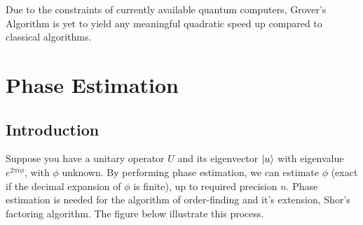 \documentclass{article}
\begin{document}
\noindent
Due to the constraints of currently available quantum computers, Grover's Algorithm is yet to yield any  meaningful quadratic speed up compared to classical algorithms\cite{noauthor_grovers_2022}.

\pagebreak

\section{Phase Estimation}
\vspace{5mm}

\subsection{Introduction}
Suppose you have a unitary operator $U$ and its eigenvector $\ket{u}$ with eigenvalue $e^{2\pi i \phi}$, with $\phi$ unknown. By performing phase estimation, we can estimate $\phi$ (exact if the decimal expansion of $\phi$ is finite), up to required precision $n$. Phase estimation is needed for the algorithm of order-finding and it's extension, Shor's factoring algorithm. The figure below illustrate this process.
\end{document}
